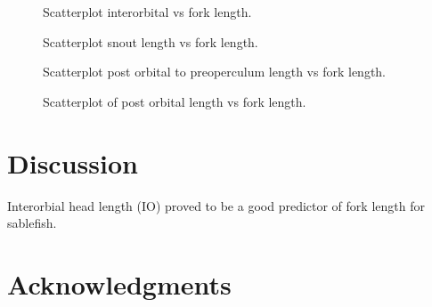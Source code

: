 \documentclass[12pt]{article}\usepackage[]{graphicx}\usepackage[]{color}
\begin{document}
\begin{figure}[htb]

{\centering {} 

}

\caption{Scatterplot interorbital vs fork length.}\label{fig:figure4}
\end{figure}

\begin{figure}[htb]

{\centering {} 

}

\caption{Scatterplot snout length vs fork length.}\label{fig:figure5}
\end{figure}

\begin{figure}[htb]

{\centering {} 

}

\caption{Scatterplot post orbital to preoperculum length vs fork length.}\label{fig:figure6}
\end{figure}

\begin{figure}[htb]

{\centering {} 

}

\caption{Scatterplot of post orbital length vs fork length.}\label{fig:figure7}
\end{figure}
\clearpage

\hypertarget{discussion-1}{%
\section{Discussion}\label{discussion-1}}

Interorbial head length (IO) proved to be a good predictor of fork length for sablefish.

\hypertarget{acknowledgments}{%
\section{Acknowledgments}\label{acknowledgments}}
\end{document}
